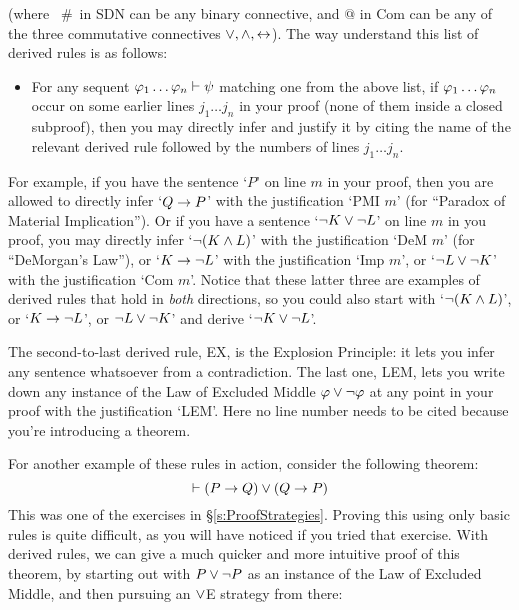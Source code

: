 \noindent (where  \ \#\  in SDN can be any binary connective, and $@$ in Com can be any of the three commutative connectives $\vee, \wedge, \leftrightarrow$).  The way understand this list of derived rules is as follows:

\begin{itemize}
\item For any sequent $\mathcal{\varphi}_1 \ldots \mathcal{\varphi}_n \vdash \mathcal{\psi}$ matching one from the above list, if $\mathcal{\varphi}_1 \ldots \mathcal{\varphi}_n$ occur on some earlier lines $j_1 \ldots j_n$ in your proof (none of them inside a closed subproof), then you may directly infer \meta{\psi} and justify it by citing the name of the relevant derived rule followed by the numbers of lines $j_1 \ldots j_n$.
\end{itemize}
For example, if you have the sentence `$P$' on line $m$ in your proof, then you are allowed to directly infer `$Q \rightarrow P$' with the justification `PMI $m$' (for ``Paradox of Material Implication'').   Or if you have a sentence `$\neg K \vee \neg L$' on  line $m$ in you proof, you may directly infer `$\neg(K \wedge L)$' with the justification `DeM $m$' (for ``DeMorgan's Law''), or `$K \rightarrow \neg L$' with the justification `Imp $m$', or `$\neg L \vee \neg K$' with the justification `Com $m$'.  Notice that these latter three are examples of derived rules that hold in \emph{both} directions, so you could also start with `$\neg(K \wedge L)$', or `$K \rightarrow \neg L$', or $\neg L \vee \neg K$' and derive `$\neg K \vee \neg L$'.

The second-to-last derived rule, EX, is the Explosion Principle: it lets you infer any sentence whatsoever from a contradiction.  The last one, LEM, lets you write down any instance of the Law of Excluded Middle $\mathcal{\varphi} \vee \neg \mathcal{\varphi}$ at any point in your proof with the justification `LEM'.   Here no line number needs to be cited because you're introducing a theorem.

For another example of these rules in action, consider the following theorem:
$$\vdash (P \rightarrow Q) \vee (Q \rightarrow P)$$
This was one of the exercises in \S\ref{s:ProofStrategies}.  Proving this using only basic rules is quite difficult, as you will have noticed if you tried that exercise.  With derived rules, we can give a much quicker and more intuitive proof of this theorem, by starting out with $P \vee \neg P$ as an instance of the Law of Excluded Middle, and then pursuing an $\vee$E strategy from there:\\


